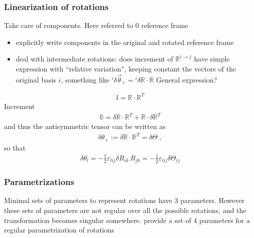 \documentclass[letterpaper,10pt,english]{jupyterBook}
\begin{document}
\subsubsection{Linearization of rotations}
\label{\detokenize{ch/kinematics-rotations-tensors:linearization-of-rotations}}
\sphinxAtStartPar
{} Take care of components. Here referred to \(0\) reference frame
\begin{itemize}
\item {} 
\sphinxAtStartPar
explicitly write components in the original and rotated reference frame

\item {} 
\sphinxAtStartPar
deal with intermediate rotations: does increment of \(\mathbb{R}^{i \rightarrow j}\) have simple expression with “relative variation”, keeping constant the vectors of the original basis \(i\), something like \({}^i \delta \vec{\theta}_\times = {}^i \delta \mathbb{R} \cdot \mathbb{R}\) General expression?

\end{itemize}
\begin{equation*}
\begin{split}\mathbb{I} = \mathbb{R} \cdot \mathbb{R}^T\end{split}
\end{equation*}
\sphinxAtStartPar
Increment
\begin{equation*}
\begin{split}\mathbb{0} = \delta \mathbb{R} \cdot \mathbb{R}^T + \mathbb{R} \cdot \delta \mathbb{R}^T\end{split}
\end{equation*}
\sphinxAtStartPar
and thus the antisymmetric tensor can be written as
\begin{equation*}
\begin{split}\delta \theta_{\times} := \delta \mathbb{R} \cdot \mathbb{R}^T = \delta \mathbb{\Theta} \ ,\end{split}
\end{equation*}
\sphinxAtStartPar
so that
\begin{equation*}
\begin{split}\delta \theta_l = -\frac{1}{2} \varepsilon_{lij} \delta R_{ik} \, R_{jk} = - \frac{1}{2} \varepsilon_{lij} \delta \Theta_{ij}\end{split}
\end{equation*}

\subsubsection{Parametrizations}
\label{\detokenize{ch/kinematics-rotations-tensors:parametrizations}}\label{\detokenize{ch/kinematics-rotations-tensors:classical-mechanics-kinematics-rotations-param}}
\sphinxAtStartPar
Minimal sets of parameters to represent rotations have 3 parameters. However these sets of parameters are not regular over all the possible rotations, and the transformation becomes singular somewhere. {\hyperref[\detokenize{ch/kinematics-rotations-tensors:classical-mechanics-kinematics-rotations-param-quaternions}]{}} provide a set of 4 parameters for a regular parametrization of rotations
\end{document}
